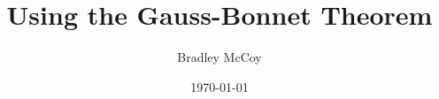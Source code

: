 \documentclass[10pt]{article}
\title{Using the Gauss-Bonnet Theorem}
\author{Bradley McCoy}
\date{\today}
\begin{document}
\maketitle \tableofcontents 




%





{
\small

%

}
\end{document}
